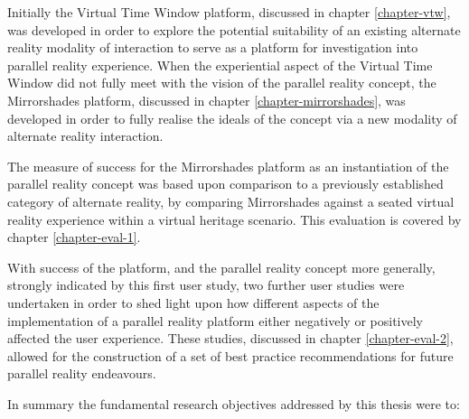 Initially the Virtual Time Window platform, discussed in chapter \ref{chapter-vtw}, was developed in order to explore the potential suitability of an existing alternate reality modality of interaction to serve as a platform for investigation into parallel reality experience. When the experiential aspect of the Virtual Time Window did not fully meet with the vision of the parallel reality concept, the Mirrorshades platform, discussed in chapter \ref{chapter-mirrorshades}, was developed in order to fully realise the ideals of the concept via a new modality of alternate reality interaction.

The measure of success for the Mirrorshades platform as an instantiation of the parallel reality concept was based upon comparison to a previously established category of alternate reality, by comparing Mirrorshades against a seated virtual reality experience within a virtual heritage scenario. This evaluation is covered by chapter \ref{chapter-eval-1}.

With success of the platform, and the parallel reality concept more generally, strongly indicated by this first user study, two further user studies were undertaken in order to shed light upon how different aspects of the implementation of a parallel reality platform either negatively or positively affected the user experience. These studies, discussed in chapter \ref{chapter-eval-2}, allowed for the construction of a set of best practice recommendations for future parallel reality endeavours.


In summary the fundamental research objectives addressed by this thesis were to:

